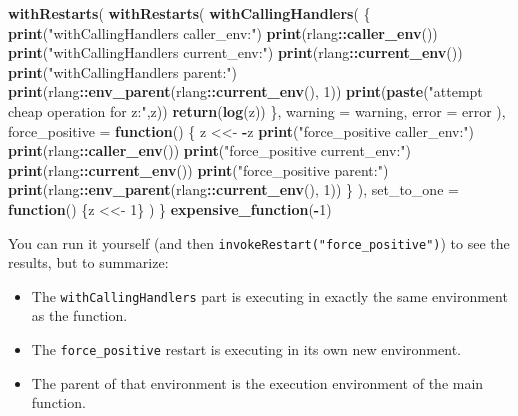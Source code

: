 \documentclass[]{book}
\newenvironment{Shaded}{\begin{snugshade}}{\end{snugshade}}
\newcommand{\ControlFlowTok}[1]{\textcolor[rgb]{0.13,0.29,0.53}{\textbf{#1}}}
\newcommand{\DataTypeTok}[1]{\textcolor[rgb]{0.13,0.29,0.53}{#1}}
\newcommand{\DecValTok}[1]{\textcolor[rgb]{0.00,0.00,0.81}{#1}}
\newcommand{\KeywordTok}[1]{\textcolor[rgb]{0.13,0.29,0.53}{\textbf{#1}}}
\newcommand{\NormalTok}[1]{#1}
\newcommand{\OperatorTok}[1]{\textcolor[rgb]{0.81,0.36,0.00}{\textbf{#1}}}
\newcommand{\StringTok}[1]{\textcolor[rgb]{0.31,0.60,0.02}{#1}}
\providecommand{\tightlist}{%
  \setlength{\itemsep}{0pt}\setlength{\parskip}{0pt}}
\begin{document}
\begin{Shaded}
\begin{Highlighting}[]
  \KeywordTok{withRestarts}\NormalTok{(}
    \KeywordTok{withRestarts}\NormalTok{(}
      \KeywordTok{withCallingHandlers}\NormalTok{(}
\NormalTok{        \{}
          \KeywordTok{print}\NormalTok{(}\StringTok{"withCallingHandlers caller_env:"}\NormalTok{)}
          \KeywordTok{print}\NormalTok{(rlang}\OperatorTok{::}\KeywordTok{caller_env}\NormalTok{())}
          \KeywordTok{print}\NormalTok{(}\StringTok{"withCallingHandlers current_env:"}\NormalTok{)}
          \KeywordTok{print}\NormalTok{(rlang}\OperatorTok{::}\KeywordTok{current_env}\NormalTok{())}
          \KeywordTok{print}\NormalTok{(}\StringTok{"withCallingHandlers parent:"}\NormalTok{)}
          \KeywordTok{print}\NormalTok{(rlang}\OperatorTok{::}\KeywordTok{env_parent}\NormalTok{(rlang}\OperatorTok{::}\KeywordTok{current_env}\NormalTok{(), }\DecValTok{1}\NormalTok{))}
          \KeywordTok{print}\NormalTok{(}\KeywordTok{paste}\NormalTok{(}\StringTok{"attempt cheap operation for z:"}\NormalTok{,z))}
          \KeywordTok{return}\NormalTok{(}\KeywordTok{log}\NormalTok{(z))}
\NormalTok{        \},}
        \DataTypeTok{warning =}\NormalTok{ warning,}
        \DataTypeTok{error =}\NormalTok{ error}
\NormalTok{      ),}
      \DataTypeTok{force_positive =} \ControlFlowTok{function}\NormalTok{() \{}
\NormalTok{        z <<-}\StringTok{ }\OperatorTok{-}\NormalTok{z}
        \KeywordTok{print}\NormalTok{(}\StringTok{"force_positive caller_env:"}\NormalTok{)}
        \KeywordTok{print}\NormalTok{(rlang}\OperatorTok{::}\KeywordTok{caller_env}\NormalTok{())}
        \KeywordTok{print}\NormalTok{(}\StringTok{"force_positive current_env:"}\NormalTok{)}
        \KeywordTok{print}\NormalTok{(rlang}\OperatorTok{::}\KeywordTok{current_env}\NormalTok{())}
        \KeywordTok{print}\NormalTok{(}\StringTok{"force_positive parent:"}\NormalTok{)}
        \KeywordTok{print}\NormalTok{(rlang}\OperatorTok{::}\KeywordTok{env_parent}\NormalTok{(rlang}\OperatorTok{::}\KeywordTok{current_env}\NormalTok{(), }\DecValTok{1}\NormalTok{))}
\NormalTok{      \}}
\NormalTok{    ),}
    \DataTypeTok{set_to_one =} \ControlFlowTok{function}\NormalTok{() \{z <<-}\StringTok{ }\DecValTok{1}\NormalTok{\}}
\NormalTok{  )}
\NormalTok{\}}
\KeywordTok{expensive_function}\NormalTok{(}\OperatorTok{-}\DecValTok{1}\NormalTok{)}
\end{Highlighting}
\end{Shaded}

You can run it yourself (and then \texttt{invokeRestart("force\_positive")}) to see the results, but to summarize:

\begin{itemize}
\tightlist
\item
  The \texttt{withCallingHandlers} part is executing in exactly the same environment as the function.
\item
  The \texttt{force\_positive} restart is executing in its own new environment.
\item
  The parent of that environment is the execution environment of the main function.
\end{itemize}
\end{document}
